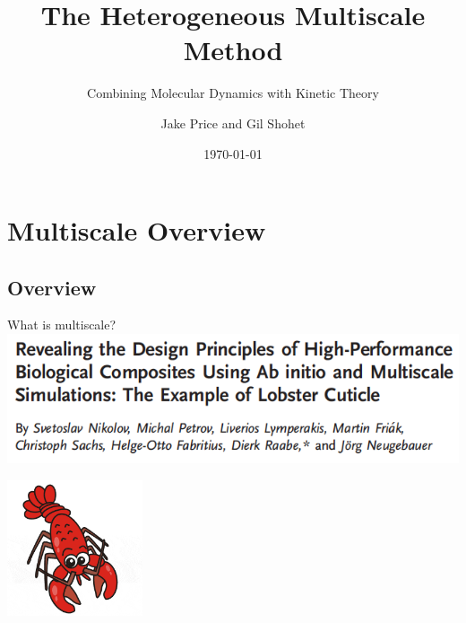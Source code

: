 \documentclass{beamer}
\title{The Heterogeneous Multiscale Method}
\subtitle{Combining Molecular Dynamics with Kinetic Theory}
\author[Price and Shohet]{Jake Price and Gil Shohet}
\institute[CPSSW]{Computational Physics Student Summer Workshop}
\date{\today}
\begin{document}
	\begin{frame}
		\titlepage
	\end{frame}
	
	
	
	\section{Multiscale Overview}
	\subsection{Overview}
	
	\begin{frame}[t]{What is multiscale?}
	\vspace{0.25cm}
	\hfill
			\includegraphics[width=\textwidth]{lobster.png}
			\hspace*{\fill}
			\vspace{1em}
			
				\hfill
			\includegraphics[width=0.3\textwidth]{lobsterclipart.png}
			\hspace*{\fill}
				\end{frame}
	
\end{document}

